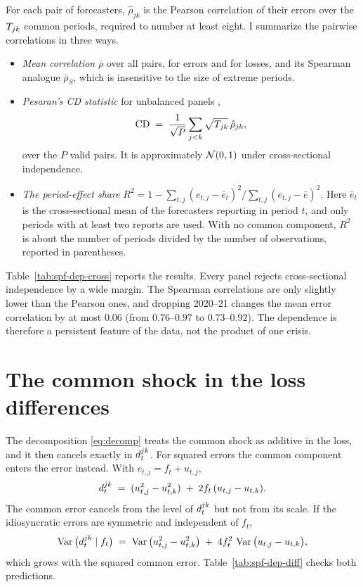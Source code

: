 \begin{appendix}
For each pair of forecasters, $\hat\rho_{jk}$ is the Pearson correlation of their errors
over the $T_{jk}$ common periods, required to number at least eight. I summarize the
pairwise correlations in three ways.
\begin{itemize}[leftmargin=*]
  \item \emph{Mean correlation} $\bar\rho$ over all pairs, for errors and for losses, and
    its Spearman analogue $\bar\rho_S$, which is insensitive to the size of extreme
    periods.
  \item \emph{Pesaran's CD statistic} for unbalanced panels \citep{pesaran2021},
    \begin{equation}
      \mathrm{CD} \;=\; \frac{1}{\sqrt{P}}\sum_{j<k}\sqrt{T_{jk}}\,\hat\rho_{jk},
    \end{equation}
    over the $P$ valid pairs. It is approximately $\mathcal{N}(0,1)$ under cross-sectional
    independence.
  \item \emph{The period-effect share} $R^2=1-\sum_{t,j}(e_{t,j}-\bar e_t)^2/
    \sum_{t,j}(e_{t,j}-\bar e)^2$. Here $\bar e_t$ is the cross-sectional mean of the
    forecasters reporting in period $t$, and only periods with at least two reports are
    used. With no common component, $R^2$ is about the number of periods divided by the
    number of observations, reported in parentheses.
\end{itemize}
Table~\ref{tab:spf-dep-cross} reports the results. Every panel rejects cross-sectional
independence by a wide margin. The Spearman correlations are only slightly lower than
the Pearson ones, and dropping 2020--21 changes the mean error correlation by at most
$0.06$ (from $0.76$--$0.97$ to $0.73$--$0.92$). The dependence is therefore a persistent
feature of the data, not the product of one crisis.

\tabSpfDepCross

\section{The common shock in the loss differences}
\label{app:spf-dep-diff}

The decomposition \eqref{eq:decomp} treats the common shock as additive in the loss, and
it then cancels exactly in $d^{jk}_t$. For squared errors the common component enters
the error instead. With $e_{t,j}=f_t+u_{t,j}$,
\begin{equation}
  d^{jk}_t \;=\; (u_{t,j}^2-u_{t,k}^2) \;+\; 2f_t\,(u_{t,j}-u_{t,k}).
  \label{eq:reentry}
\end{equation}
The common error cancels from the level of $d^{jk}_t$ but not from its scale. If the
idiosyncratic errors are symmetric and independent of $f_t$,
\begin{equation}
  \operatorname{Var}\big(d^{jk}_t\mid f_t\big) \;=\; \operatorname{Var}\big(u_{t,j}^2-u_{t,k}^2\big)
  \;+\; 4f_t^2\,\operatorname{Var}\big(u_{t,j}-u_{t,k}\big),
\end{equation}
which grows with the squared common error. Table~\ref{tab:spf-dep-diff} checks both
predictions.


\end{appendix}

